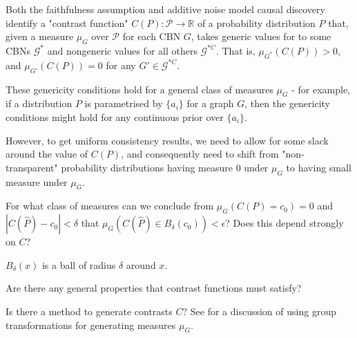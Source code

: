 Both the faithfulness assumption and additive noise model causal discovery identify a "contrast function" $C(P):\mathcal{P}\to\mathbb{R}$ of a probability distribution $P$ that, given a measure $\mu_G$ over $\mathcal{P}$ for each CBN $G$, takes generic values for to some CBNs $\mathcal{G}^*$ and nongeneric values for all others $\mathcal{G}^{*C}$. That is, $\mu_{G^*}(C(P))>0$, and $\mu_{G'}(C(P))=0$ for any $G'\in\mathcal{G}^{*C}$.

\begin{question}\label{q:generalised_genericity}
    These genericity conditions hold for a general class of measures $\mu_G$ - for example, if a distribution $P$ is parametrised by $\{a_i\}$ for a graph $G$, then the genericity conditions might hold for any continuous prior over $\{a_i\}$.
    
    However, to get uniform consistency results, we need to allow for some slack around the value of $C(P)$, and consequently need to shift from "non-transparent" probability distributions having measure 0 under $\mu_G$ to having small measure under $\mu_G$.
    
    For what class of measures can we conclude from $\mu_G(C(P)=c_0)=0$ and $|C(\hat{P})-c_0|<\delta$ that $\mu_G(C(\hat{P})\in B_\delta (c_0)) < \epsilon$? Does this depend strongly on $C$?
    
    $B_\delta(x)$ is a ball of radius $\delta$ around $x$.
\end{question}
    
\begin{question}
    Are there any general properties that contrast functions must satisfy?
\end{question}

\begin{question}
    Is there a method to generate contrasts $C$? See \cite{besserve_group_2017} for a discussion of using group transformations for generating measures $\mu_G$.
\end{question}
